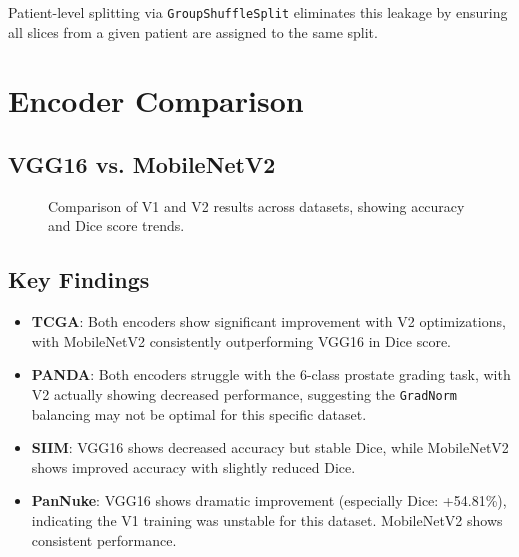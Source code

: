 \documentclass[11pt,a4paper,twoside]{report}
\newcommand{\model}[1]{\texttt{#1}}
\newcommand{\code}[1]{\texttt{#1}}
\begin{document}
Patient-level splitting via \code{GroupShuffleSplit} eliminates this leakage by ensuring all slices from a given patient are assigned to the same split.

\section{Encoder Comparison}

\subsection{VGG16 vs. MobileNetV2}

\begin{figure}[htbp]
\centering
{}
\caption{Comparison of V1 and V2 results across datasets, showing accuracy and Dice score trends.}
\label{fig:v1_v2_comparison}
\end{figure}

\subsection{Key Findings}

\begin{itemize}
    \item \textbf{TCGA}: Both encoders show significant improvement with V2 optimizations, with MobileNetV2 consistently outperforming VGG16 in Dice score.
    \item \textbf{PANDA}: Both encoders struggle with the 6-class prostate grading task, with V2 actually showing decreased performance, suggesting the \model{GradNorm} balancing may not be optimal for this specific dataset.
    \item \textbf{SIIM}: VGG16 shows decreased accuracy but stable Dice, while MobileNetV2 shows improved accuracy with slightly reduced Dice.
    \item \textbf{PanNuke}: VGG16 shows dramatic improvement (especially Dice: +54.81\%), indicating the V1 training was unstable for this dataset. MobileNetV2 shows consistent performance.
\end{itemize}
\end{document}
